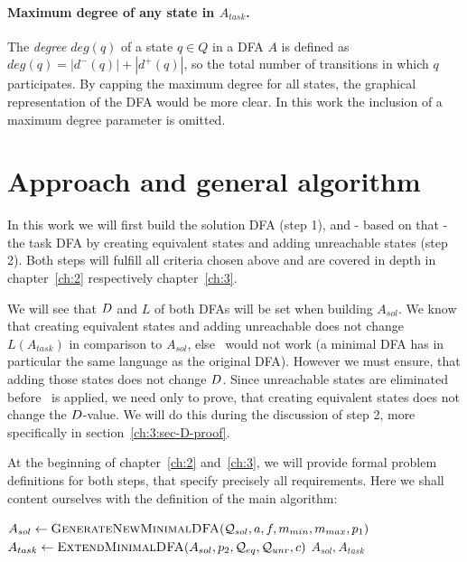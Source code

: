 \paragraph*{Maximum degree of any state in $A_{task}$.}

The \emph{degree} $deg(q)$ of a state $q \in Q$ in a DFA $A$ is defined as $deg(q) = |d^-(q)| + |d^+(q)|$, so the total number of transitions in which $q$ participates. By capping the maximum degree for all states, the graphical representation of the DFA would be more clear. In this work the inclusion of a maximum degree parameter is omitted.


\section{Approach and general algorithm}

In this work we will first build the solution DFA (step 1), and - based on that - the task DFA by creating equivalent states and adding unreachable states (step 2). Both steps will fulfill all criteria chosen above and are covered in depth in chapter~\ref{ch:2} respectively chapter~\ref{ch:3}.

We will see that $D$ and $L$ of both DFAs will be set when building $A_{sol}$. We know that creating equivalent states and adding unreachable does not change $L(A_{task})$ in comparison to $A_{sol}$, else \MinAlg\ would not work (a minimal DFA has in particular the same language as the original DFA). However we must ensure, that adding those states does not change $D$. Since unreachable states are eliminated before \CompDist\ is applied, we need only to prove, that creating equivalent states does not change the $D$-value. We will do this during the discussion of step 2, more specifically in section~\ref{ch:3:sec-D-proof}.

At the beginning of chapter~\ref{ch:2} and~\ref{ch:3}, we will provide formal problem definitions for both steps, that specify precisely all requirements. Here we shall content ourselves with the definition of the main algorithm:
\vspace{0.2cm}
\begin{algorithmic}[1]
	\State $A_{sol} \gets \textsc{GenerateNewMinimalDFA}(\mathcal{Q}_{sol}, a, f, m_{min}, m_{max}, p_1)$
	\State $A_{task} \gets \textsc{ExtendMinimalDFA}(A_{sol}, p_2, \mathcal{Q}_{eq},\mathcal{Q}_{unr}, c)$
	\State \Return $A_{sol}, A_{task}$
	\EndFunction
\end{algorithmic}


